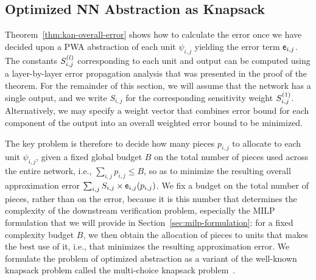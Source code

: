 \subsection{Optimized NN Abstraction as Knapsack}\label{sec:optimalkan-abs}

Theorem~\ref{thm:kan-overall-error} shows how to calculate the error once we have decided upon a PWA abstraction of each unit $\psi_{i,j}$ yielding the error term $\mathsf{e}_{i,j}$. The constants $S^{(l)}_{i,j}$ corresponding to each unit and output can be computed using a layer-by-layer error propagation analysis that was presented in the proof of the theorem.  For the remainder of this section, we will assume that the network has a single output, and we write $S_{i,j}$ for the corresponding sensitivity weight $S^{(1)}_{i,j}$. Alternatively, we may specify a weight vector that combines error bound for each component of the output into an overall weighted error bound to be minimized.

The key problem is therefore to decide how many pieces $p_{i,j}$ to allocate to each unit $\psi_{i,j}$, given a fixed global budget $B$ on the total number of pieces used across the entire network, i.e., $\sum_{i,j} p_{i,j} \leq B$, so as to minimize the resulting overall approximation error $\sum_{i,j} S_{i,j} \times \mathsf{e}_{i,j}(p_{i,j})$. We fix a budget on the total number of pieces, rather than on the error, because it is this number that determines the complexity of the downstream verification problem, especially the MILP formulation that we will provide in Section~\ref{sec:milp-formulation}: for a fixed complexity budget $B$, we then obtain the allocation of pieces to units that makes the best use of it, i.e., that minimizes the resulting approximation error.
We formulate the problem of optimized abstraction as a variant of the well-known knapsack problem called the multi-choice knapsack problem~\cite{Kellerer+Others/2004/MultipleChoice}.

